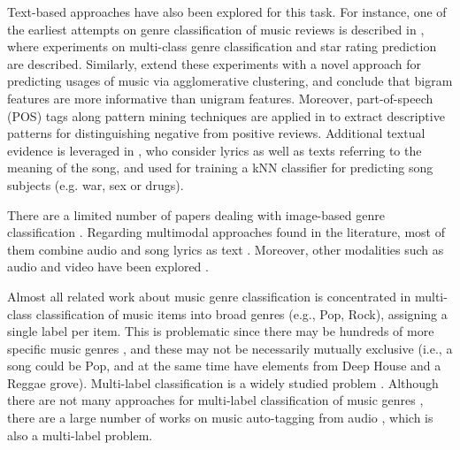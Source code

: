 Text-based approaches have also been explored for this task. For instance, one of the earliest attempts on genre classification of music reviews is described in \citep{Hu2005}, where experiments on multi-class genre classification and star rating prediction are described. Similarly, \citep{Hu2006} extend these experiments with a novel approach for predicting usages of music via agglomerative clustering, and conclude that bigram features are more informative than unigram features. 
Moreover, part-of-speech (POS) tags along pattern mining techniques are applied in \citep{Downie2006} to extract descriptive patterns for distinguishing negative from positive reviews. Additional textual evidence is leveraged in \citep{Choi2014}, who consider lyrics as well as texts referring to the meaning of the song, and used for training a kNN classifier for predicting song subjects (e.g. war, sex or drugs).

There are a limited number of papers dealing with image-based genre classification \citep{libeks2011you}.
Regarding multimodal approaches found in the literature, most of them combine audio and song lyrics as text \citep{laurier2008multimodal,neumayer2007integration}. Moreover, other modalities such as audio and video have been explored \citep{schindler2015audio}. 

Almost all related work about music genre classification is concentrated in multi-class classification of music items into broad genres (e.g., Pop, Rock), assigning a single label per item. This is problematic since there may be hundreds of more specific music genres \citep{pachet2000taxonomy}, and these may not be necessarily mutually exclusive (i.e., a song could be Pop, and at the same time have elements from Deep House and a Reggae grove). 
Multi-label classification is a widely studied problem \citep{tsoumakas2006multi,jain2016extreme}. 
Although there are not many approaches for multi-label classification of music genres \citep{Sanden2011,wang2009tag}, there are a large number of works on music auto-tagging from audio \citep{Choi2016,wang2009tag}, which is also a multi-label problem.


